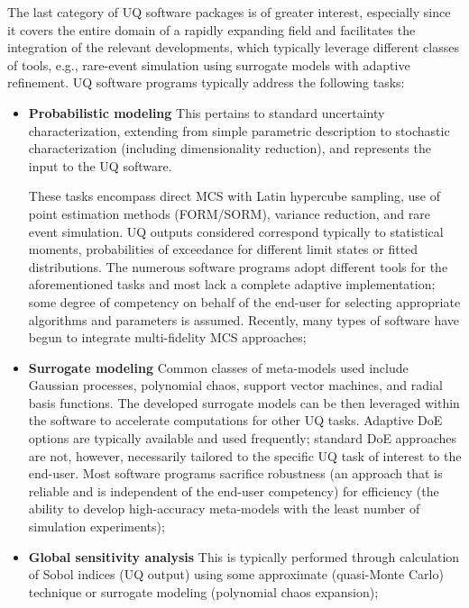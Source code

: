 The last category of UQ software packages is of greater interest, especially since it covers the entire domain of a rapidly expanding field and facilitates the integration of the relevant developments, which typically leverage different classes of tools, e.g., rare-event simulation using surrogate models with adaptive refinement. UQ software programs typically address the following tasks:

\begin{itemize}

    \item \textbf{Probabilistic modeling} This pertains to standard uncertainty characterization, extending from simple parametric description to stochastic characterization (including dimensionality reduction), and represents the input to the UQ software. 
    
    These tasks encompass direct MCS with Latin hypercube sampling, use of point estimation methods (FORM/SORM),  variance reduction, and rare event simulation. UQ outputs considered correspond typically to statistical moments, probabilities of exceedance for different limit states or fitted distributions. The numerous software programs adopt different tools for the aforementioned tasks and most lack a complete adaptive implementation; some degree of competency on behalf of the end-user for selecting appropriate algorithms and parameters is assumed. Recently, many types of software have begun to integrate multi-fidelity MCS approaches;

    \item \textbf{Surrogate modeling} Common classes of meta-models used include Gaussian processes, polynomial chaos, support vector machines, and radial basis functions. The developed surrogate models can be then leveraged within the software to accelerate computations for other UQ tasks. Adaptive DoE options are typically available and used frequently; standard DoE approaches are not, however, necessarily tailored to the specific UQ task of interest to the end-user. Most software programs sacrifice robustness (an approach that is reliable and is independent of the end-user competency) for efficiency (the ability to develop high-accuracy meta-models with the least number of simulation experiments);

    \item \textbf{Global sensitivity analysis} This is typically performed through calculation of Sobol indices (UQ output) using some approximate (quasi-Monte Carlo) technique or surrogate modeling (polynomial chaos expansion);


\end{itemize}
